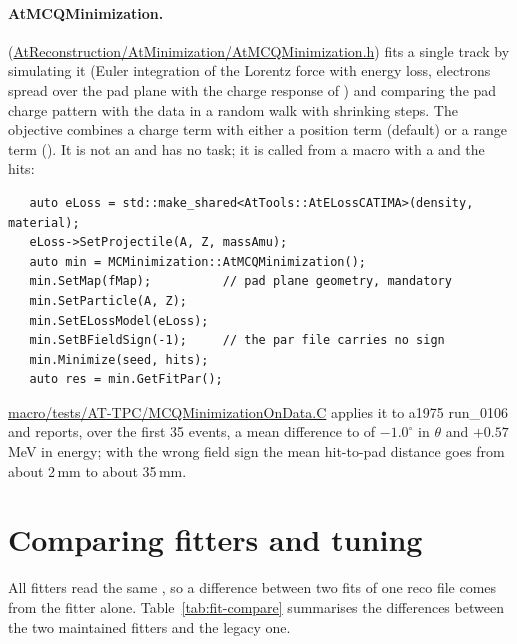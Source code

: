 \paragraph{AtMCQMinimization.} 
(\url{AtReconstruction/AtMinimization/AtMCQMinimization.h}) fits a single track by simulating it (Euler integration
of the Lorentz force with energy loss, electrons spread over the pad plane with the charge response of
) and comparing the pad charge pattern with the data in a random walk with shrinking steps. The
objective combines a charge term with either a position term (default) or a range term (). It is
not an  and has no task; it is called from a macro with a  and the hits:
\begin{verbatim}
   auto eLoss = std::make_shared<AtTools::AtELossCATIMA>(density, material);
   eLoss->SetProjectile(A, Z, massAmu);
   auto min = MCMinimization::AtMCQMinimization();
   min.SetMap(fMap);          // pad plane geometry, mandatory
   min.SetParticle(A, Z);
   min.SetELossModel(eLoss);
   min.SetBFieldSign(-1);     // the par file carries no sign
   min.Minimize(seed, hits);
   auto res = min.GetFitPar();
\end{verbatim}
\url{macro/tests/AT-TPC/MCQMinimizationOnData.C} applies it to a1975 run\_0106 and reports, over the first 35 events,
a mean difference to  of $-1.0^\circ$ in $\theta$ and $+0.57$\,MeV in energy; with the wrong field
sign the mean hit-to-pad distance goes from about 2\,mm to about 35\,mm.

\section{Comparing fitters and tuning}
\label{sec:fit-compare}

All fitters read the same , so a difference between two fits of one reco file comes from the
fitter alone. Table~\ref{tab:fit-compare} summarises the differences between the two maintained fitters and the legacy
one.

